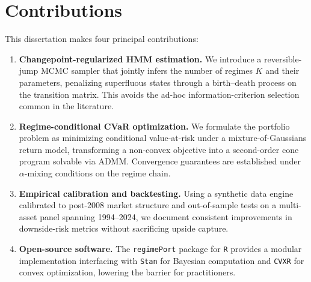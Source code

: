 \section{Contributions}

This dissertation makes four principal contributions:

\begin{enumerate}[leftmargin=*,itemsep=4pt]
  \item \textbf{Changepoint-regularized HMM estimation.} We introduce a reversible-jump MCMC sampler that jointly infers the number of regimes $K$ and their parameters, penalizing superfluous states through a birth--death process on the transition matrix. This avoids the ad-hoc information-criterion selection common in the literature.

  \item \textbf{Regime-conditional CVaR optimization.} We formulate the portfolio problem as minimizing conditional value-at-risk under a mixture-of-Gaussians return model, transforming a non-convex objective into a second-order cone program solvable via ADMM. Convergence guarantees are established under $\alpha$-mixing conditions on the regime chain.

  \item \textbf{Empirical calibration and backtesting.} Using a synthetic data engine calibrated to post-2008 market structure and out-of-sample tests on a multi-asset panel spanning 1994--2024, we document consistent improvements in downside-risk metrics without sacrificing upside capture.

  \item \textbf{Open-source software.} The \texttt{regimePort} package for \texttt{R} provides a modular implementation interfacing with \texttt{Stan} for Bayesian computation and \texttt{CVXR} for convex optimization, lowering the barrier for practitioners.

\end{enumerate}

